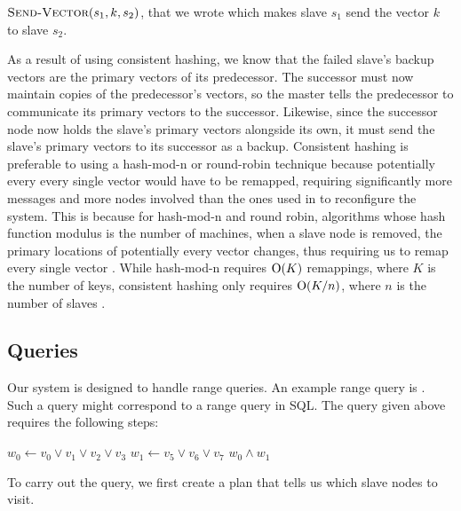 \(\mathrm{\textsc{Send-Vector}}(s_1, k, s_2)\),
that we wrote which makes slave \(s_1\) send the vector \(k\) to slave \(s_2\).
\par
As a result of using consistent hashing, we know that the failed slave's backup
vectors are the primary vectors of its predecessor. The successor must now
maintain copies of the predecessor's vectors, so the master tells the
predecessor to communicate its primary vectors to the successor. Likewise,
since the successor node now holds the slave's primary vectors alongside its
own, it must send the slave's primary vectors to its successor as a backup.
Consistent hashing is preferable to using a hash-mod-n or round-robin technique
because potentially every every single vector would have to be remapped,
requiring significantly more messages and more nodes involved than the ones
used in  to reconfigure the system. This is because for
hash-mod-n and round robin, algorithms whose hash function modulus is the
number of machines, when a slave node is removed, the primary locations of
potentially every vector changes, thus requiring us to remap every single
vector \cite{kleppman2017}. While hash-mod-n requires \(\mathrm{O}(K)\)
remappings, where \(K\) is the number of keys, consistent hashing only requires
\(\mathrm{O}(K/n)\), where \(n\) is the number of slaves
\cite{karger1997}.
%
\subsection{Queries}
Our system is designed to handle range queries. An example range query is
. Such a query might correspond to a range query in SQL.
The query given above requires the following steps:
\begin{algorithmic}
    \State $w_0 \gets v_0 \lor v_1 \lor v_2 \lor v_3$
    \State $w_1 \gets v_5 \lor v_6 \lor v_7$
    \State \Return $w_0 \land w_1$
\end{algorithmic}
To carry out the query, we first create a plan that tells us which slave nodes
to visit.
